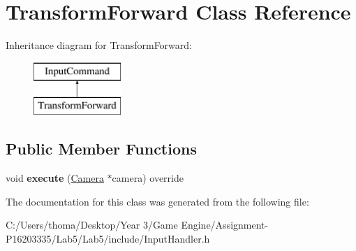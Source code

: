 \hypertarget{class_transform_forward}{}\section{Transform\+Forward Class Reference}
\label{class_transform_forward}
Inheritance diagram for Transform\+Forward\+:\begin{figure}[H]
\begin{center}
\leavevmode
\includegraphics[height=2.000000cm]{class_transform_forward}
\end{center}
\end{figure}
\subsection*{Public Member Functions}
\begin{DoxyCompactItemize}
\item 
\mbox{\label{class_transform_forward_a733214c631402934ea8c424e1cd14c05}} 
void {\bfseries execute} (\mbox{\hyperlink{class_camera}{Camera}} $\ast$camera) override
\end{DoxyCompactItemize}


The documentation for this class was generated from the following file\+:\begin{DoxyCompactItemize}
\item 
C\+:/\+Users/thoma/\+Desktop/\+Year 3/\+Game Engine/\+Assignment-\/\+P16203335/\+Lab5/\+Lab5/include/Input\+Handler.\+h\end{DoxyCompactItemize}
